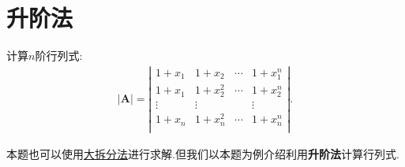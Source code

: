 \documentclass[../../main.tex]{subfiles}%
\begin{document}
\section{升阶法}

\begin{example}\label{升阶法的应用(1)例题}
计算$n$阶行列式:
\begin{align*}
|\boldsymbol{A}|=\left| \begin{matrix}
1+x_1&		1+x_2&		\cdots&		1+x_{1}^{n}\\1+x_{1}
&		1+x_{2}^{2}&		\cdots&		1+x_{2}^{n}\\
\vdots&		\vdots&		&		\vdots\\
1+x_n&		1+x_{n}^{2}&		\cdots&		1+x_{n}^{n}\\
\end{matrix} \right|.
\end{align*}
\end{example}
\begin{note}
本题也可以使用\hyperref[大拆分法]{大拆分法}进行求解.但我们以本题为例介绍利用\textbf{升阶法}计算行列式.
\end{note}
\end{document}
